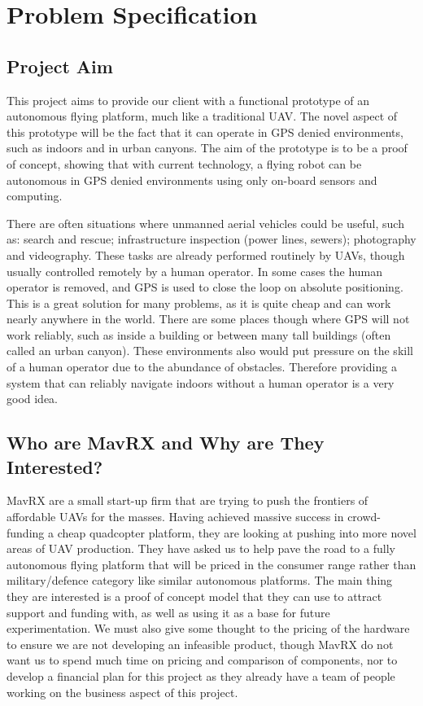 \documentclass[]{article}
\begin{document}
{\clearpage

\section{Problem Specification}
\label{sec:problem_specification}

\subsection{Project Aim}
\label{sub:what_are_we_trying_to_achieve}
\cite{OpenPilotinsgps}
This project aims to provide our client with a functional prototype of an autonomous flying platform, much like a traditional \ac{UAV}. The novel aspect of this prototype will be the fact that it can operate in \ac{GPS} denied environments, such as indoors and in urban canyons. The aim of the prototype is to be a proof of concept, showing that with current technology, a flying robot can be autonomous in \ac{GPS} denied environments using only on-board sensors and computing. 

There are often situations where unmanned aerial vehicles could be useful, such as: search and rescue; infrastructure inspection (power lines, sewers); photography and videography. These tasks are already performed routinely by \ac{UAV}s, though usually controlled remotely by a human operator. In some cases the human operator is removed, and \ac{GPS} is used to close the loop on absolute positioning. This is a great solution for many problems, as it is quite cheap and can work nearly anywhere in the world. There are some places though where \ac{GPS} will not work reliably, such as inside a building or between many tall buildings (often called an urban canyon). These environments also would put pressure on the skill of a human operator due to the abundance of obstacles. Therefore providing a system that can reliably navigate indoors without a human operator is a very good idea. 

\subsection{Who are MavRX and Why are They Interested?} %
\label{sub:why_are_mavrx_interested_in_this_work_}

MavRX are a small start-up firm that are trying to push the frontiers of affordable \ac{UAV}s for the masses. Having achieved massive success in crowd-funding a cheap quadcopter platform, they are looking at pushing into more novel areas of \ac{UAV} production. They have asked us to help pave the road to a fully autonomous flying platform that will be priced in the consumer range rather than military/defence category like similar autonomous platforms. The main thing they are interested is a proof of concept model that they can use to attract support and funding with, as well as using it as a base for future experimentation. We must also give some thought to the pricing of the hardware to ensure we are not developing an infeasible product, though MavRX do not want us to spend much time on pricing and comparison of components, nor to develop a financial plan for this project as they already have a team of people working on the business aspect of this project.  

}
\end{document}
